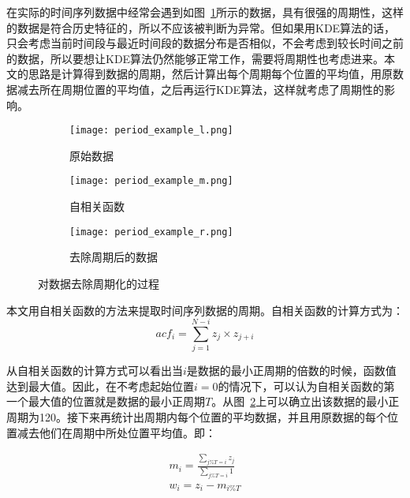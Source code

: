 在实际的时间序列数据中经常会遇到如图~\ref{fig:period:left}所示的数据，具有很强的周期性，这样的数据是符合历史特征的，所以不应该被判断为异常。但如果用KDE算法的话，只会考虑当前时间段与最近时间段的数据分布是否相似，不会考虑到较长时间之前的数据，所以要想让KDE算法仍然能够正常工作，需要将周期性也考虑进来。本文的思路是计算得到数据的周期，然后计算出每个周期每个位置的平均值，用原数据减去所在周期位置的平均值，之后再运行KDE算法，这样就考虑了周期性的影响。
\begin{figure}[htbp]
  \begin{subfigure}[b]{0.335\textwidth}
    \begin{minipage}[t]{\linewidth}
    \centering
    \texttt{[image: period\_example\_l.png]}
    \caption{原始数据}
    \label{fig:period:left}
    \end{minipage}
  \end{subfigure}
  \begin{subfigure}[b]{0.325\textwidth}
    \begin{minipage}[t]{\linewidth}
    \centering
    \texttt{[image: period\_example\_m.png]}
    \caption{自相关函数}
    \label{fig:period:middle}
    \end{minipage}
  \end{subfigure}
  \begin{subfigure}[b]{0.325\textwidth}
    \begin{minipage}[t]{\linewidth}
      \centering
      \texttt{[image: period\_example\_r.png]}
      \caption{去除周期后的数据}
      \label{fig:period:right}
      \end{minipage}
    \end{subfigure}
    \caption{对数据去除周期化的过程}
    \label{fig:period}
\end{figure}

本文用自相关函数的方法来提取时间序列数据的周期\cite{rabiner1977use}。自相关函数的计算方式为：
\begin{equation*}
  acf_i = \sum_{j=1}^{N-i}z_j\times z_{j+i}
\end{equation*}

从自相关函数的计算方式可以看出当$i$是数据的最小正周期的倍数的时候，函数值达到最大值。因此，在不考虑起始位置$i=0$的情况下，可以认为自相关函数的第一个最大值的位置就是数据的最小正周期$T$。从图~\ref{fig:period:middle}上可以确立出该数据的最小正周期为120。接下来再统计出周期内每个位置的平均数据，并且用原数据的每个位置减去他们在周期中所处位置平均值。即：

\begin{equation*}
  \begin{aligned}
  m_i = \frac{\sum\limits_{j\%T = i}z_j}{\sum\limits_{j\%T = i}1}\\
  w_i = z_i - m_{i\%T}
  \end{aligned}
\end{equation*}

